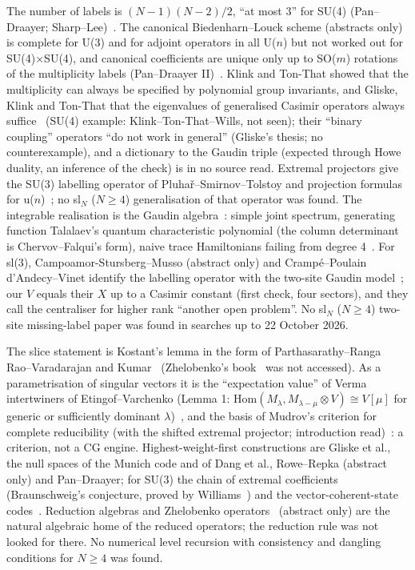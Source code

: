 \documentclass[11pt]{article}
\makeatletter
\renewcommand\subsection{\@startsection{subsection}{2}{\z@}{-2.0ex \@plus -1ex \@minus -.2ex}{0.6ex \@plus .2ex}{\normalfont\normalsize\bfseries}}
\makeatother
\begin{document}
The number of labels is $(N-1)(N-2)/2$, ``at most 3'' for SU(4) (Pan--Draayer; Sharp--Lee)~\cite{pd,sharplee}.
The canonical Biedenharn--Louck scheme (abstracts only) is complete for U(3) and for adjoint operators in all U($n$) but not worked out for SU(4)$\times$SU(4), and canonical coefficients are unique only up to SO($m$) rotations of the multiplicity labels (Pan--Draayer II)~\cite{bl,pd}.
Klink and Ton-That showed that the multiplicity can always be specified by polynomial group invariants, and Gliske, Klink and Ton-That that the eigenvalues of generalised Casimir operators always suffice~\cite{klink,gkt} (SU(4) example: Klink--Ton-That--Wills, not seen); their ``binary coupling'' operators ``do not work in general'' (Gliske's thesis; no counterexample), and a dictionary to the Gaudin triple (expected through Howe duality, an inference of the check) is in no source read.
Extremal projectors give the SU(3) labelling operator of Pluha\v{r}--Smirnov--Tolstoy and projection formulas for u($n$)~\cite{ast,psv,tolstoy}; no sl$_N$ ($N\ge4$) generalisation of that operator was found.
The integrable realisation is the Gaudin algebra~\cite{vinberg,rybnikov,ffr,mtv,hkrw}: simple joint spectrum, generating function Talalaev's quantum characteristic polynomial (the column determinant is Chervov--Falqui's form), naive trace Hamiltonians failing from degree 4~\cite{talalaev,crt,chervovfalqui}.
For sl(3), Campoamor-Stursberg--Musso (abstract only) and Cramp\'e--Poulain d'Andecy--Vinet identify the labelling operator with the two-site Gaudin model~\cite{csm,cpv}; our $V$ equals their $X$ up to a Casimir constant (first check, four sectors), and they call the centraliser for higher rank ``another open problem''.
No sl$_N$ ($N\ge4$) two-site missing-label paper was found in searches up to 22 October 2026.

\subsection{The slice theorem and highest-weight-first algorithms}\label{sec:slicelit}

The slice statement is Kostant's lemma in the form of Parthasarathy--Ranga Rao--Varadarajan and Kumar~\cite{kostant,prv,kumar} (Zhelobenko's book~\cite{zhel} was not accessed).
As a parametrisation of singular vectors it is the ``expectation value'' of Verma intertwiners of Etingof--Varchenko (Lemma 1: $\mathrm{Hom}(M_\lambda,M_{\lambda-\mu}\otimes V)\cong V[\mu]$ for generic or sufficiently dominant $\lambda$)~\cite{ev}, and the basis of Mudrov's criterion for complete reducibility (with the shifted extremal projector; introduction read)~\cite{mudrov}: a criterion, not a CG engine.
Highest-weight-first constructions are Gliske et al., the null spaces of the Munich code and of Dang et al., Rowe--Repka (abstract only) and Pan--Draayer; for SU(3) the chain of extremal coefficients (Braunschweig's conjecture, proved by Williams~\cite{williams}) and the vector-coherent-state codes~\cite{rowebahri}.
Reduction algebras and Zhelobenko operators~\cite{ko} (abstract only) are the natural algebraic home of the reduced operators; the reduction rule was not looked for there.
No numerical level recursion with consistency and dangling conditions for $N\ge4$ was found.
\end{document}
